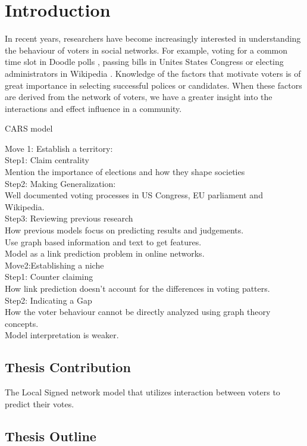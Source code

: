 \chapter{Introduction}



In recent years, researchers have become increasingly interested in understanding the behaviour of voters in social networks. For example, voting for a common time slot in Doodle polls \cite{zou2015strategicDoodle}, passing bills in Unites States Congress \cite{karimi2019multicongress} or electing administrators in Wikipedia \cite{jankowski-lorek2013MBSN,cabunducan2011voting,lee2012uncovering}. Knowledge of the factors that motivate voters is of great importance in selecting successful polices or candidates. When these factors are derived from the network of voters, we have a greater insight into the interactions and effect influence in a community. 


CARS model

Move 1: Establish a territory:\\
Step1: Claim centrality\\
Mention the importance of elections  and how they shape societies\\

Step2: Making Generalization:\\
Well documented voting processes in US Congress, EU parliament and Wikipedia.\\

Step3: Reviewing previous research\\
How previous models focus on predicting results and judgements.\\
Use graph based information and text to get features.   \\
Model as a link prediction problem in online networks.\\

Move2:Establishing a niche\\

Step1: Counter claiming\\
How link prediction doesn't account for the differences in voting patters.\\

Step2: Indicating a Gap\\
How the voter behaviour cannot be directly analyzed using graph theory concepts.\\
Model interpretation is weaker.\\



\section{Thesis Contribution}
The Local Signed network model that utilizes interaction between voters to predict their votes. 

\section{Thesis Outline}
